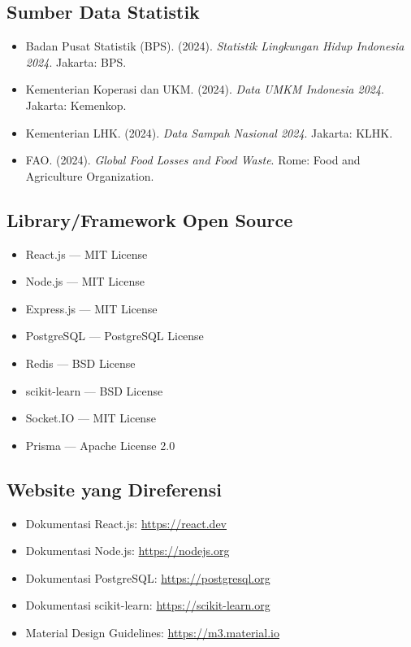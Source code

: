 \subsection{Sumber Data Statistik}
\begin{itemize}[leftmargin=*]
    \item Badan Pusat Statistik (BPS). (2024). \textit{Statistik Lingkungan Hidup Indonesia 2024}. Jakarta: BPS.
    \item Kementerian Koperasi dan UKM. (2024). \textit{Data UMKM Indonesia 2024}. Jakarta: Kemenkop.
    \item Kementerian LHK. (2024). \textit{Data Sampah Nasional 2024}. Jakarta: KLHK.
    \item FAO. (2024). \textit{Global Food Losses and Food Waste}. Rome: Food and Agriculture Organization.
\end{itemize}

\subsection{Library/Framework Open Source}
\begin{itemize}[leftmargin=*]
    \item React.js — MIT License
    \item Node.js — MIT License
    \item Express.js — MIT License
    \item PostgreSQL — PostgreSQL License
    \item Redis — BSD License
    \item scikit-learn — BSD License
    \item Socket.IO — MIT License
    \item Prisma — Apache License 2.0
\end{itemize}

\subsection{Website yang Direferensi}
\begin{itemize}[leftmargin=*]
    \item Dokumentasi React.js: \url{https://react.dev}
    \item Dokumentasi Node.js: \url{https://nodejs.org}
    \item Dokumentasi PostgreSQL: \url{https://postgresql.org}
    \item Dokumentasi scikit-learn: \url{https://scikit-learn.org}
    \item Material Design Guidelines: \url{https://m3.material.io}
\end{itemize}
